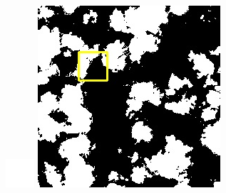 \documentclass[10pt]{ctexart}
\begin{document}
\begin{figure}[H]
{{\begin{minipage}[b]{0.15\linewidth}
            \includegraphics[width=1\linewidth]{../log/spoon2/cut/tmp_cut_LC81321192014054LGN00_03055_my.jpg}\vspace{4pt}
            \includegraphics[width=1\linewidth]{../log/spoon2/cut/LC80350192014190LGN00_06561_my.jpg}\vspace{4pt}

\end{minipage}}}
\end{figure}
\end{document}
